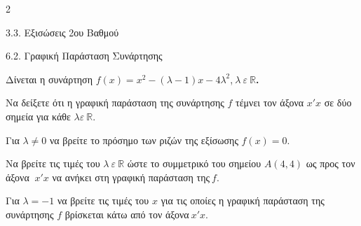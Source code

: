 \begin{ylh}{2}
    \item 3.3. Εξισώσεις 2ου Βαθμού
    \item 6.2. Γραφική Παράσταση Συνάρτησης
\end{ylh}
Δίνεται η συνάρτηση $f(x) = x^{2} - (\lambda - 1)x - 4\lambda^{2}$,$\ \lambda\ \varepsilon\ \mathbb{R}$\textbf{.}
\begin{alist}
\item Να δείξετε ότι η γραφική παράσταση της συνάρτησης $f$ τέμνει τον άξονα $x'x$ σε δύο σημεία για κάθε $\lambda\varepsilon\ \mathbb{R}$.

\item Για $\lambda \neq 0$ να βρείτε το πρόσημο των ριζών της εξίσωσης $f(x) = 0$.
\item Να βρείτε τις τιμές του $\lambda\ \varepsilon\ \mathbb{R}$ ώστε το συμμετρικό του σημείου $A(4,4)$ ως προς τον άξονα $\ x'x$ να ανήκει στη γραφική παράσταση της$\ f$.

\item Για $\lambda = - 1$ να βρείτε τις τιμές του $x$ για τις οποίες η γραφική παράσταση της συνάρτησης $f$ βρίσκεται κάτω από τον άξονα$\ x'x$.
\end{alist}

